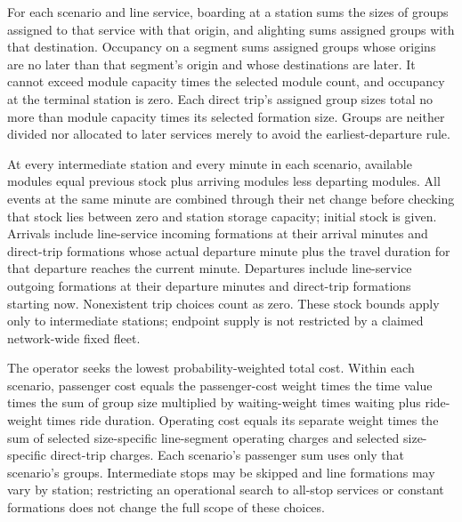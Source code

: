 \documentclass[10pt]{article}
\begin{document}
For each scenario and line service, boarding at a station sums the sizes of groups assigned to that service with that origin, and alighting sums assigned groups with that destination. Occupancy on a segment sums assigned groups whose origins are no later than that segment's origin and whose destinations are later. It cannot exceed module capacity times the selected module count, and occupancy at the terminal station is zero. Each direct trip's assigned group sizes total no more than module capacity times its selected formation size. Groups are neither divided nor allocated to later services merely to avoid the earliest-departure rule.

At every intermediate station and every minute in each scenario, available modules equal previous stock plus arriving modules less departing modules. All events at the same minute are combined through their net change before checking that stock lies between zero and station storage capacity; initial stock is given. Arrivals include line-service incoming formations at their arrival minutes and direct-trip formations whose actual departure minute plus the travel duration for that departure reaches the current minute. Departures include line-service outgoing formations at their departure minutes and direct-trip formations starting now. Nonexistent trip choices count as zero. These stock bounds apply only to intermediate stations; endpoint supply is not restricted by a claimed network-wide fixed fleet.

The operator seeks the lowest probability-weighted total cost. Within each scenario, passenger cost equals the passenger-cost weight times the time value times the sum of group size multiplied by waiting-weight times waiting plus ride-weight times ride duration. Operating cost equals its separate weight times the sum of selected size-specific line-segment operating charges and selected size-specific direct-trip charges. Each scenario's passenger sum uses only that scenario's groups. Intermediate stops may be skipped and line formations may vary by station; restricting an operational search to all-stop services or constant formations does not change the full scope of these choices.
\end{document}
